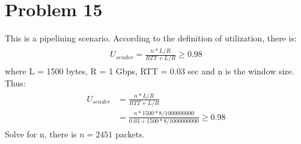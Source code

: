 \documentclass[titlepage, paper=a4, fontsize=11pt]{scrartcl} %
\numberwithin{equation}{section} %
\numberwithin{table}{section} %
\begin{document}
\section*{Problem 15}
This is a pipelining scenario. According to the definition of utilization, there is:
\begin{align*} 
\begin{split}
U_{sender} = \frac{n*L/R}{RTT+L/R} \geq 0.98
\end{split}					
\end{align*}
where L = 1500 bytes, R = 1 Gbps, RTT = 0.03 sec and n is the window size.
Thus:
\begin{align*} 
\begin{split}
U_{sender} &= \frac{n*L/R}{RTT+L/R} \\
&=  \frac{n*1500*8/1000000000}{0.03+1500*8/1000000000} \geq 0.98
\end{split}					
\end{align*}
Solve for n, there is $n=2451$ packets.
\\


\end{document}
